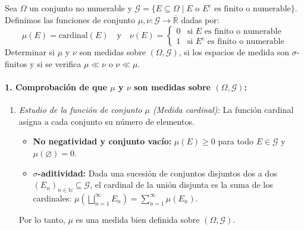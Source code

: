 \newpage
\begin{problema}
Sea $\Omega$ un conjunto no numerable y $\mathcal{G} = \{E \subseteq \Omega \mid E \text{ o } E^c \text{ es finito o numerable}\}$. Definimos las funciones de conjunto $\mu, \nu : \mathcal{G} \to \overline{\mathbb{R}}$ dadas por:
\[
    \mu(E) = \text{cardinal}(E) \quad \text{y} \quad \nu(E) = \begin{cases} 0 & \text{si } E \text{ es finito o numerable} \\ 1 & \text{si } E^c \text{ es finito o numerable} \end{cases}
\]
Determinar si $\mu$ y $\nu$ son medidas sobre $(\Omega, \mathcal{G})$, si los espacios de medida son $\sigma$-finitos y si se verifica $\mu \ll \nu$ o $\nu \ll \mu$.

\tcblower

\paragraph{1. Comprobación de que $\mu$ y $\nu$ son medidas sobre $(\Omega, \mathcal{G})$:}
\begin{enumerate}[label=\alph*)]
    \item \textit{Estudio de la función de conjunto $\mu$ (Medida cardinal):}
    La función cardinal asigna a cada conjunto su número de elementos.
    \begin{itemize}
        \item \textbf{No negatividad y conjunto vacío:} $\mu(E) \ge 0$ para todo $E \in \mathcal{G}$ y $\mu(\varnothing) = 0$.
        \item \textbf{$\sigma$-aditividad:} Dada una sucesión de conjuntos disjuntos dos a dos $(E_n)_{n \in \mathbb{N}} \subseteq \mathcal{G}$, el cardinal de la unión disjunta es la suma de los cardinales: $\mu\left(\bigsqcup_{n=1}^\infty E_n\right) = \sum_{n=1}^\infty \mu(E_n)$.
    \end{itemize}
    Por lo tanto, $\mu$ es una medida bien definida sobre $(\Omega, \mathcal{G})$.


\end{enumerate}
\end{problema}
